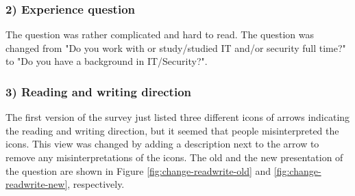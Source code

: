     \subsubsection*{2) Experience question}
    The question was rather complicated and hard to read. The question was changed from "Do you work with or study/studied IT and/or security full time?" to "Do you have a background in IT/Security?".

    \subsubsection*{3) Reading and writing direction}
    The first version of the survey just listed three different icons of arrows indicating the reading and writing direction, but it seemed that people misinterpreted the icons. This view was changed by adding a description next to the arrow to remove any misinterpretations of the icons. The old and the new presentation of the question are shown in Figure \ref{fig:change-readwrite-old} and \ref{fig:change-readwrite-new}, respectively.

